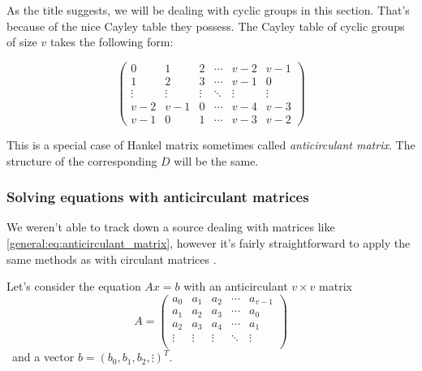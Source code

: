 \documentclass{article}
\theoremstyle{plain}
\theoremstyle{definition}
\theoremstyle{remark}
\begin{document}
            As the title suggests, we will be dealing with cyclic groups in this section. That's because of the nice Cayley table they possess. The Cayley table of cyclic groups of size $v$ takes the following form:
            
            \begin{equation}
                \label{general:eq:anticirculant_matrix}
                \begin{pmatrix}
                    0 & 1 & 2 & \cdots & v-2 & v-1 \\ 
                    1 & 2 & 3 & \cdots & v-1 & 0 \\
                    \vdots & \vdots & \vdots & \ddots & \vdots & \vdots \\
                    v-2 & v-1 & 0 & \cdots & v-4 & v-3 \\
                    v-1 & 0 & 1 & \cdots & v-3 & v-2
                \end{pmatrix}
            \end{equation}
	
            This is a special case of Hankel matrix sometimes called \emph{anticirculant matrix}. The structure of the corresponding $D$ will be the same.
            
            \subsubsection{Solving equations with anticirculant matrices}
            \label{general:sec:anticirculant}
                We weren't able to track down a source dealing with matrices like \eqref{general:eq:anticirculant_matrix}, however it's fairly straightforward to apply the same methods as with circulant matrices \cite{wiki:circulant_matrix}.
                
                Let's consider the equation $Ax=b$ with an anticirculant $v \times v$ matrix
                \begin{equation}
                    A =
                    \begin{pmatrix}
                        a_0 & a_1 & a_2 & \cdots & a_{v-1} \\ 
                        a_1 & a_2 & a_3 & \cdots & a_0 \\
                        a_2 & a_3 & a_4 & \cdots & a_1 \\
                        \vdots & \vdots & \vdots & \ddots & \vdots \\
                    \end{pmatrix}
                \end{equation}\
                and a vector $b=(b_0, b_1, b_2, \vdots)^T$. 
                
\end{document}
